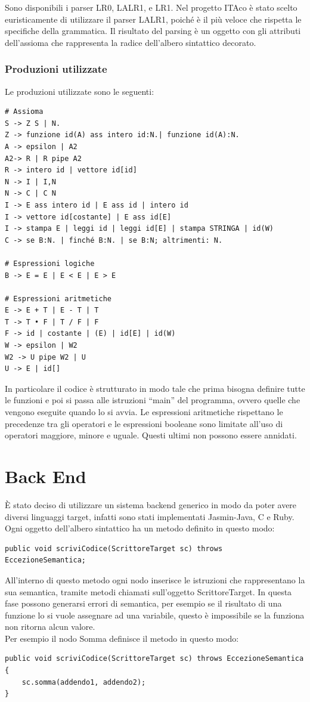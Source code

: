 \documentclass[11pt, a4paper, twoside, notitlepage]{report}
\begin{document}
Sono disponibili i parser LR0, LALR1, e LR1. Nel progetto ITAco è stato scelto
euristicamente di utilizzare il parser LALR1, poiché è il più veloce che
rispetta le specifiche della grammatica. Il risultato del parsing è un oggetto
con gli attributi dell'assioma che rappresenta la radice dell'albero sintattico
decorato.
\subsection{Produzioni utilizzate}
Le produzioni utilizzate sono le seguenti:
\begin{verbatim}
# Assioma
S -> Z S | N.
Z -> funzione id(A) ass intero id:N.| funzione id(A):N.
A -> epsilon | A2
A2-> R | R pipe A2 
R -> intero id | vettore id[id]
N -> I | I,N
N -> C | C N
I -> E ass intero id | E ass id | intero id
I -> vettore id[costante] | E ass id[E]
I -> stampa E | leggi id | leggi id[E] | stampa STRINGA | id(W)
C -> se B:N. | finché B:N. | se B:N; altrimenti: N.

# Espressioni logiche
B -> E = E | E < E | E > E

# Espressioni aritmetiche
E -> E + T | E - T | T
T -> T • F | T / F | F
F -> id | costante | (E) | id[E] | id(W)
W -> epsilon | W2
W2 -> U pipe W2 | U
U -> E | id[]
\end{verbatim}

In particolare il codice è strutturato in modo tale che prima bisogna definire
tutte le funzioni e poi si passa alle istruzioni ``main'' del programma, ovvero
quelle che vengono eseguite quando lo si avvia. Le espressioni aritmetiche
rispettano le precedenze tra gli operatori e le espressioni booleane sono
limitate all'uso di operatori maggiore, minore e uguale. Questi ultimi non
possono essere annidati.
\chapter{Back End}
\label{back_end}
È stato deciso di utilizzare un sistema backend generico in modo da poter avere
diversi linguaggi target, infatti sono stati implementati Jasmin-Java, C e Ruby.
Ogni oggetto dell'albero sintattico ha un metodo definito in questo modo:

\begin{verbatim}
public void scriviCodice(ScrittoreTarget sc) throws EccezioneSemantica;
\end{verbatim}

All'interno di questo metodo ogni nodo inserisce le istruzioni che rappresentano
la sua semantica, tramite metodi chiamati sull'oggetto ScrittoreTarget. In
questa fase possono generarsi errori di semantica, per esempio se il
risultato di una funzione lo si vuole assegnare ad una variabile, questo è
impossibile se la funziona non ritorna alcun valore.
\\Per esempio il nodo Somma definisce il metodo in questo modo:
\begin{verbatim}
public void scriviCodice(ScrittoreTarget sc) throws EccezioneSemantica {
	sc.somma(addendo1, addendo2);
}
\end{verbatim}
\end{document}
